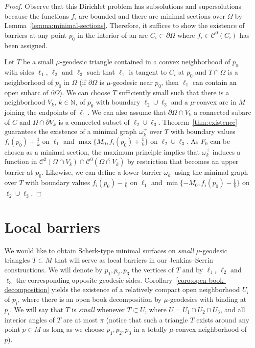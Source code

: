 \documentclass[a4paper,10pt,reqno]{amsart}
\theoremstyle{definition}
\theoremstyle{remark}
\numberwithin{equation}{section}
\begin{document}
\begin{proof}
Observe that this Dirichlet problem has subsolutions and supersolutions because the functions $f_i$ are bounded and there are minimal sections over $\Omega$ by Lemma~\ref{lemma:minimal-sections}. Therefore, it suffices to show the existence of barriers at any point $p_0$ in the interior of an arc $C_i\subset\partial\Omega$ where $f_i\in\mathcal C^0(C_i)$ has been assigned. 

Let $T$ be a small $\mu$-geodesic triangle contained in a convex neighborhood of $p_0$ with sides $\ell_1$, $\ell_2$ and $\ell_3$ such that $\ell_1$ is tangent to $C_i$ at $p_0$ and $T\cap \Omega$ is a neighborhood of $p_0$ in $\Omega$ (if $\partial\Omega$ is $\mu$-geodesic near $p_0$, then $\ell_1$ can contain an open subarc of $\partial\Omega$). We can choose $T$ sufficiently small such that there is a neighborhood $V_k$, $k\in\mathbb{N}$, of $p_0$ with boundary $\ell_2\cup\ell_3$ and a $\mu$-convex arc in $M$ joining the endpoints of $\ell_1$. We can also assume that $\partial\Omega\cap V_k$ a connected subarc of $C$ and $\Omega\cap\partial V_k$ is a connected subset of $\ell_2\cup\ell_3$. Theorem~\ref{thm:existence} guarantees the existence of a minimal graph $\omega^+_k$ over $T$ with boundary values $f_i(p_0)+\frac{1}{k}$ on $\ell_1$ and $\max\{M_0,f_i(p_0)+\tfrac{1}{k}\}$ on $\ell_2\cup\ell_3$. As $F_0$ can be chosen as a minimal section, the maximum principle implies that $\omega_k^+$ induces a function in $\mathcal C^2(\Omega\cap V_k)\cap\mathcal C^0(\overline{\Omega\cap V_k})$ by restriction that becomes an upper barrier at $p_0$. Likewise, we can define a lower barrier $\omega_k^-$ using the minimal graph over $T$ with boundary values $f_i(p_0)-\frac{1}{k}$ on $\ell_1$ and $\min\{-M_0,f_i(p_0)-\frac{1}{k}\}$ on $\ell_2\cup\ell_3$.
\end{proof}

\section{Local barriers}\label{sec:local-barriers}
	
We would like to obtain Scherk-type minimal surfaces on \emph{small} $\mu$-geodesic triangles $T\subset M$ that will serve as local barriers in our Jenkins--Serrin constructions. We will denote by $p_1,p_2,p_3$ the vertices of $T$ and by $\ell_1$, $\ell_2$ and $\ell_3$ the corresponding opposite geodesic sides. Corollary~\ref{coro:open-book-decomposition} yields the existence of a relatively compact open neighborhood $U_i$ of $p_i$, where there is an open book decomposition by $\mu$-geodesics with binding at $p_i$. We will say that $T$ is \emph{small} whenever $T\subset U$, where $U=U_1\cap U_2\cap U_3$, and all interior angles of $T$ are at most $\pi$ (notice that such a triangle $T$ exists around any point $p\in M$ as long as we choose $p_1,p_2,p_3$ in a totally $\mu$-convex neighborhood of $p$).
	
\end{document}
